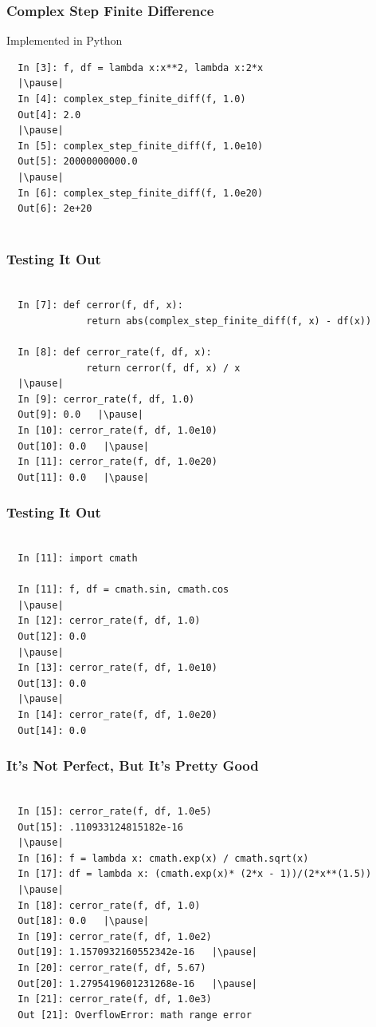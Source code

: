 \documentclass{beamer}
\begin{document}
\begin{frame}[fragile]
\frametitle{Complex Step Finite Difference}

Implemented in Python


\begin{lstlisting}
  In [3]: f, df = lambda x:x**2, lambda x:2*x
  |\pause|
  In [4]: complex_step_finite_diff(f, 1.0)
  Out[4]: 2.0
  |\pause|
  In [5]: complex_step_finite_diff(f, 1.0e10)
  Out[5]: 20000000000.0
  |\pause|
  In [6]: complex_step_finite_diff(f, 1.0e20)
  Out[6]: 2e+20


\end{lstlisting}
\end{frame}

\begin{frame}[fragile]
\frametitle{Testing It Out}

\begin{lstlisting}

  In [7]: def cerror(f, df, x):
              return abs(complex_step_finite_diff(f, x) - df(x))

  In [8]: def cerror_rate(f, df, x):
              return cerror(f, df, x) / x
  |\pause|
  In [9]: cerror_rate(f, df, 1.0)
  Out[9]: 0.0   |\pause|
  In [10]: cerror_rate(f, df, 1.0e10)
  Out[10]: 0.0   |\pause|
  In [11]: cerror_rate(f, df, 1.0e20)
  Out[11]: 0.0   |\pause|
\end{lstlisting}

\end{frame}

\begin{frame}[fragile]
\frametitle{Testing It Out}

\begin{lstlisting}

  In [11]: import cmath

  In [11]: f, df = cmath.sin, cmath.cos
  |\pause|
  In [12]: cerror_rate(f, df, 1.0)
  Out[12]: 0.0
  |\pause|
  In [13]: cerror_rate(f, df, 1.0e10)
  Out[13]: 0.0
  |\pause|
  In [14]: cerror_rate(f, df, 1.0e20)
  Out[14]: 0.0
\end{lstlisting}

\end{frame}

\begin{frame}[fragile]
\frametitle{It's Not Perfect, But It's Pretty Good}

\begin{lstlisting}

  In [15]: cerror_rate(f, df, 1.0e5)
  Out[15]: .110933124815182e-16
  |\pause|
  In [16]: f = lambda x: cmath.exp(x) / cmath.sqrt(x)
  In [17]: df = lambda x: (cmath.exp(x)* (2*x - 1))/(2*x**(1.5))
  |\pause|
  In [18]: cerror_rate(f, df, 1.0)
  Out[18]: 0.0   |\pause|
  In [19]: cerror_rate(f, df, 1.0e2)
  Out[19]: 1.1570932160552342e-16   |\pause|
  In [20]: cerror_rate(f, df, 5.67)
  Out[20]: 1.2795419601231268e-16   |\pause|
  In [21]: cerror_rate(f, df, 1.0e3)
  Out [21]: OverflowError: math range error

\end{lstlisting}

\end{frame}
\end{document}
